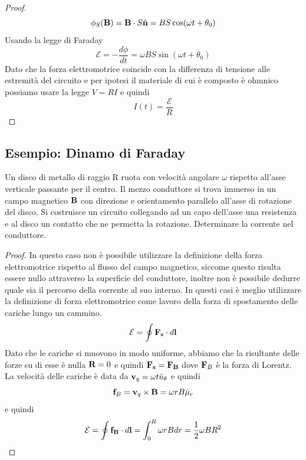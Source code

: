 \begin{proof}
	\begin{equation*}
		\phi_{S} (\bold{B}) = \bold{B} \cdot S\hat{\bold{n}} = BS\cos(\omega t + \theta_0)
	\end{equation*}
Usando la legge di Faraday
\begin{equation*}
	\mathcal{E} = - \frac{d \phi}{dt} = \omega BS\sin(\omega t+\theta_0) 
\end{equation*}
Dato che la forza elettromotrice coincide con la differenza di tensione alle estremit\`a del circuito e per ipotesi il materiale di cui \`e composto \`e ohmnico possiamo usare la legge $V = RI$ e quindi 
\begin{equation*}
	I(t) = \frac{\mathcal{E}}{R}
\end{equation*}
\end{proof}

\subsection{Esempio: Dinamo di Faraday}


Un disco di metallo di raggio R ruota con velocit\`a angolare $\omega$ rispetto all'asse verticale passante per il centro. Il mezzo conduttore si trova immerso in un campo magnetico $\bold{B}$ con direzione e orientamento parallelo all'asse di rotazione del disco. Si costruisce un circuito collegando ad un capo dell'asse una resistenza e al disco un contatto che ne permetta la rotazione. Determinare la corrente nel conduttore.

\begin{proof}
	In questo caso non \`e possibile utilizzare la definizione della forza elettromotrice rispetto al flusso del campo magnetico, siccome questo risulta essere nullo attraverso la superficie del conduttore, inoltre non \`e possibile dedurre quale sia il percorso della corrente al suo interno. In questi casi \`e meglio utilizzare la definizione di forza elettromotrice come lavoro della forza di spostamento delle cariche lungo un cammino.
	\begin{equation*}
		\mathcal{E} = \oint \bold{F_s} \cdot d \bold{l} 
	\end{equation*}
Dato che le cariche si muovono in modo uniforme, abbiamo che la risultante delle forze su di esse \`e nulla $\bold{R} = 0$ e quindi $\bold{F_s} = \bold{F_{B}}$ dove $\bold{F}_{B}$ \`e la forza di Lorentz. La velocit\`a delle cariche \`e data da $\bold{v}_q = \omega t \hat{u}_\theta$ e quindi 
\begin{equation*}
	\bold{f}_B = \bold{v}_q \times \bold{B} = \omega r B \hat{\mu}_r
\end{equation*}
e quindi 
\begin{equation*}
	\mathcal{E} = \oint \bold{f_{B}} \cdot d \bold{l} = \int_{0}^{R} \omega rBdr = \frac{1}{2}\omega BR^2
\end{equation*}

\end{proof} 

